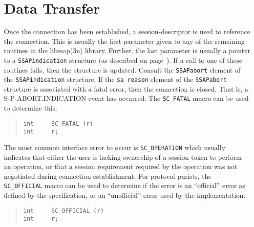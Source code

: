 \section	{Data Transfer}
Once the connection has been established,
a session-descriptor is used to reference the connection.
This is usually the first parameter given to any of the remaining routines in
the \man libssap(3n) library.
Further,
the last parameter is usually a pointer to a \verb"SSAPindication" structure
(as described on page~\pageref{SSAPindication}).
If a call to one of these routines fails,
then the structure is updated.
Consult the \verb"SSAPabort" element of the \verb"SSAPindication" structure.
If the \verb"sa_reason" element of the \verb"SSAPabort" structure is
associated with a fatal error,
then the connection is closed.
That is, a {\sf S-P-ABORT.INDICATION\/} event has occurred.
The \verb"SC_FATAL" macro can be used to determine this.
\begin{quote}\small\begin{verbatim}
int     SC_FATAL (r)
int     r;
\end{verbatim}\end{quote}
The most common interface error to occur is \verb"SC_OPERATION" which usually
indicates that either the user is lacking ownership of a session token
to perform an operation,
or that a session requirement required by the operation was not negotiated
during connection establishment.
For protocol purists,
the \verb"SC_OFFICIAL" macro can be used to determine if the error is an
``official'' error as defined by the specification,
or an ``unofficial'' error used by the implementation.
\begin{quote}\small\begin{verbatim}
int     SC_OFFICIAL (r)
int     r;
\end{verbatim}\end{quote}


